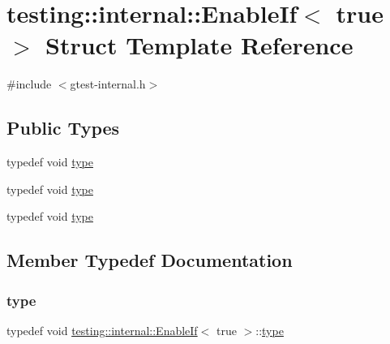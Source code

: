 \hypertarget{structtesting_1_1internal_1_1_enable_if_3_01true_01_4}{}\section{testing\+::internal\+::Enable\+If$<$ true $>$ Struct Template Reference}
\label{structtesting_1_1internal_1_1_enable_if_3_01true_01_4}


{\ttfamily \#include $<$gtest-\/internal.\+h$>$}

\subsection*{Public Types}
\begin{DoxyCompactItemize}
\item 
typedef void \mbox{\hyperlink{structtesting_1_1internal_1_1_enable_if_3_01true_01_4_a9398d803f1fdd99ff41823746f6299ff}{type}}
\item 
typedef void \mbox{\hyperlink{structtesting_1_1internal_1_1_enable_if_3_01true_01_4_a9398d803f1fdd99ff41823746f6299ff}{type}}
\item 
typedef void \mbox{\hyperlink{structtesting_1_1internal_1_1_enable_if_3_01true_01_4_a9398d803f1fdd99ff41823746f6299ff}{type}}
\end{DoxyCompactItemize}


\subsection{Member Typedef Documentation}
\mbox{\label{structtesting_1_1internal_1_1_enable_if_3_01true_01_4_a9398d803f1fdd99ff41823746f6299ff}} 
\subsubsection{\texorpdfstring{type}{type}\hspace{0.1cm}{\footnotesize\ttfamily [1/3]}}
{\footnotesize\ttfamily typedef void \mbox{\hyperlink{structtesting_1_1internal_1_1_enable_if}{testing\+::internal\+::\+Enable\+If}}$<$ true $>$\+::\mbox{\hyperlink{structtesting_1_1internal_1_1_enable_if_3_01true_01_4_a9398d803f1fdd99ff41823746f6299ff}{type}}}

